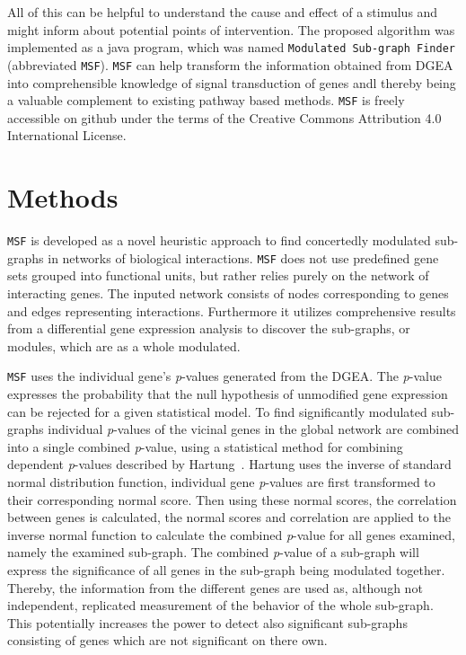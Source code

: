 \documentclass[10pt,a4paper,twocolumn]{article}
\begin{document}
All of this can be helpful to understand the cause and effect of a stimulus
and might inform about potential points of intervention. The proposed
algorithm was implemented as a java program, which was named
\texttt{Modulated Sub-graph Finder} (abbreviated
\texttt{MSF}). \texttt{MSF} can help transform the information obtained
from DGEA into comprehensible knowledge of signal transduction of genes andl
thereby being a valuable complement to existing pathway based
methods. \texttt{MSF} is freely accessible on github  under the terms of the Creative Commons Attribution 4.0
International License.

\section*{Methods}
\texttt{MSF} is developed as a novel heuristic approach to
find concertedly modulated sub-graphs in networks of biological interactions.
\texttt{MSF} does not use predefined gene sets grouped into
functional units, but rather relies purely on the network of interacting genes.
The inputed network consists of nodes corresponding to genes and edges
representing interactions. Furthermore it utilizes comprehensive results from a
differential gene expression analysis to discover the sub-graphs, or modules, which
are as a whole modulated.

\texttt{MSF} uses the individual gene's \textit{p}-values generated
from the DGEA. The \textit{p}-value expresses the probability that the
null hypothesis of unmodified gene expression can be rejected for a
given statistical model. To find significantly modulated sub-graphs
individual \textit{p}-values of the vicinal genes in the global
network are combined into a single combined \textit{p}-value, using a
statistical method for combining dependent \textit{p}-values described
by Hartung~\cite{Hartung}. Hartung uses the inverse of standard normal
distribution function, individual gene \textit{p}-values are first
transformed to their corresponding normal score. Then using these
normal scores, the correlation between genes is calculated, the normal
scores and correlation are applied to the inverse normal function to
calculate the combined \textit{p}-value for all genes examined, namely the
examined sub-graph. The combined \textit{p}-value of a sub-graph will
express the significance of all genes in the sub-graph being modulated
together. Thereby, the information from the different genes are used as,
although not independent, replicated measurement of the behavior of the whole
sub-graph. This potentially increases the power to detect also significant
sub-graphs consisting of genes which are not significant on there own.
\newline
\end{document}
